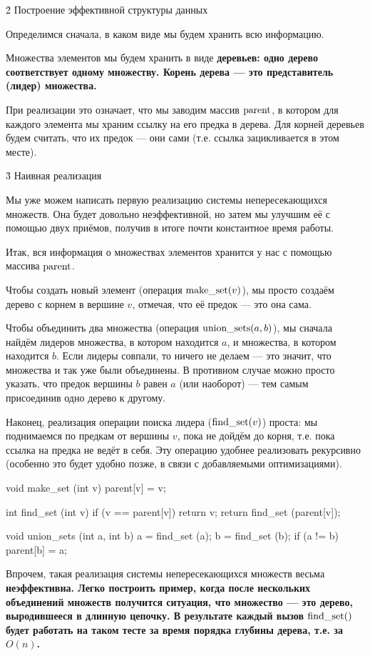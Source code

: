 \h2{ Построение эффективной структуры данных }

Определимся сначала, в каком виде мы будем хранить всю информацию.

Множества элементов мы будем хранить в виде \bf{деревьев}: одно дерево соответствует одному множеству. Корень дерева --- это представитель (лидер) множества.

При реализации это означает, что мы заводим массив ${\rm parent}$, в котором для каждого элемента мы храним ссылку на его предка в дерева. Для корней деревьев будем считать, что их предок --- они сами (т.е. ссылка зацикливается в этом месте).



\h3{ Наивная реализация }

Мы уже можем написать первую реализацию системы непересекающихся множеств. Она будет довольно неэффективной, но затем мы улучшим её с помощью двух приёмов, получив в итоге почти константное время работы.

Итак, вся информация о множествах элементов хранится у нас с помощью массива ${\rm parent}$.

Чтобы создать новый элемент (операция ${\rm make\_set}(v)$), мы просто создаём дерево с корнем в вершине $v$, отмечая, что её предок --- это она сама.

Чтобы объединить два множества (операция ${\rm union\_sets}(a,b)$), мы сначала найдём лидеров множества, в котором находится $a$, и множества, в котором находится $b$. Если лидеры совпали, то ничего не делаем --- это значит, что множества и так уже были объединены. В противном случае можно просто указать, что предок вершины $b$ равен $a$ (или наоборот) --- тем самым присоединив одно дерево к другому.

Наконец, реализация операции поиска лидера (${\rm find\_set}(v)$) проста: мы поднимаемся по предкам от вершины $v$, пока не дойдём до корня, т.е. пока ссылка на предка не ведёт в себя. Эту операцию удобнее реализовать рекурсивно (особенно это будет удобно позже, в связи с добавляемыми оптимизациями).

\code
void make_set (int v) {
	parent[v] = v;
}

int find_set (int v) {
	if (v == parent[v])
		return v;
	return find_set (parent[v]);
}

void union_sets (int a, int b) {
	a = find_set (a);
	b = find_set (b);
	if (a != b)
		parent[b] = a;
}
\endcode

Впрочем, такая реализация системы непересекающихся множеств весьма \bf{неэффективна}. Легко построить пример, когда после нескольких объединений множеств получится ситуация, что множество --- это дерево, выродившееся в длинную цепочку. В результате каждый вызов ${\rm find\_set}()$ будет работать на таком тесте за время порядка глубины дерева, т.е. за $O(n)$.

